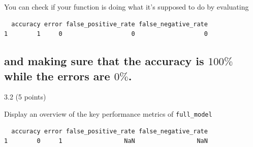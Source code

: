\documentclass[
  letterpaper,
  DIV=11,
  numbers=noendperiod]{scrartcl}
\newenvironment{Shaded}{\begin{snugshade}}{\end{snugshade}}
\newcommand{\AttributeTok}[1]{\textcolor[rgb]{0.40,0.45,0.13}{#1}}
\newcommand{\DecValTok}[1]{\textcolor[rgb]{0.68,0.00,0.00}{#1}}
\newcommand{\FloatTok}[1]{\textcolor[rgb]{0.68,0.00,0.00}{#1}}
\newcommand{\FunctionTok}[1]{\textcolor[rgb]{0.28,0.35,0.67}{#1}}
\newcommand{\NormalTok}[1]{\textcolor[rgb]{0.00,0.23,0.31}{#1}}
\newcommand{\OtherTok}[1]{\textcolor[rgb]{0.00,0.23,0.31}{#1}}
\newcommand{\SpecialCharTok}[1]{\textcolor[rgb]{0.37,0.37,0.37}{#1}}
\newcommand{\StringTok}[1]{\textcolor[rgb]{0.13,0.47,0.30}{#1}}
\begin{document}
You can check if your function is doing what it's supposed to do by
evaluating

\begin{Shaded}
\end{Shaded}

\begin{verbatim}
  accuracy error false_positive_rate false_negative_rate
1        1     0                   0                   0
\end{verbatim}

\hypertarget{and-making-sure-that-the-accuracy-is-100-while-the-errors-are-0.}{%
\subsection{\texorpdfstring{and making sure that the accuracy is
\(100\%\) while the errors are
\(0\%\).}{and making sure that the accuracy is 100\textbackslash\% while the errors are 0\textbackslash\%.}}\label{and-making-sure-that-the-accuracy-is-100-while-the-errors-are-0.}}

3.2 (5 points)

Display an overview of the key performance metrics of
\texttt{full\_model}

\begin{Shaded}
\end{Shaded}

\begin{verbatim}
  accuracy error false_positive_rate false_negative_rate
1        0     1                 NaN                 NaN
\end{verbatim}
\end{document}
